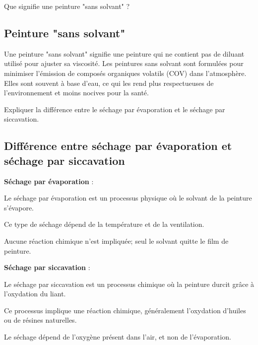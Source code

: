 \documentclass[answers]{exam}
\begin{document}
\begin{questions}
\begin{solution}
\end{solution}

\question[1] Que signifie une peinture "sans solvant" ?
  

\begin{solution}

\subsection*{Peinture "sans solvant"}

Une peinture "sans solvant" signifie une peinture qui ne contient pas de diluant utilisé pour ajuster sa viscosité. Les peintures sans solvant sont formulées pour minimiser l'émission de composés organiques volatils (COV) dans l'atmosphère. Elles sont souvent à base d'eau, ce qui les rend plus respectueuses de l'environnement et moins nocives pour la santé.

\end{solution}

\question[1] Expliquer la différence entre le séchage par évaporation et le séchage par siccavation.  
  

\begin{solution}

\subsection*{Différence entre séchage par évaporation et séchage par siccavation}

\begin{compactitem}
    \item \textbf{Séchage par évaporation} :
    \begin{compactitem}
        \item Le séchage par évaporation est un processus physique où le solvant de la peinture s'évapore.
        \item Ce type de séchage dépend de la température et de la ventilation.
        \item Aucune réaction chimique n'est impliquée; seul le solvant quitte le film de peinture.
    \end{compactitem}
    
    \item \textbf{Séchage par siccavation} :
    \begin{compactitem}
        \item Le séchage par siccavation est un processus chimique où la peinture durcit grâce à l'oxydation du liant.
        \item Ce processus implique une réaction chimique, généralement l’oxydation d’huiles ou de résines naturelles.
        \item Le séchage dépend de l'oxygène présent dans l'air, et non de l'évaporation.
    \end{compactitem}
\end{compactitem}


\end{solution}
\end{questions}
\end{document}
